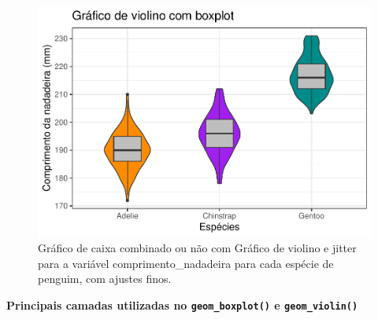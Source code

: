 \documentclass[
]{article}
\begin{document}
\begin{figure}
\centering
\includegraphics{epr_files/figure-latex/fig-boxplot-violin-fino-3.pdf}
\caption{\label{fig:fig-boxplot-violin-fino-3}Gráfico de caixa combinado ou não com Gráfico de violino e jitter para a variável comprimento\_nadadeira para cada espécie de penguim, com ajustes finos.}
\end{figure}

\textbf{Principais camadas utilizadas no \texttt{geom\_boxplot()} e \texttt{geom\_violin()}}
\end{document}
